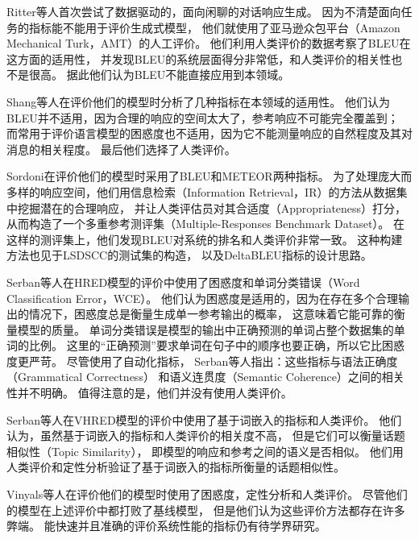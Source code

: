 Ritter等人首次尝试了数据驱动的，面向闲聊的对话响应生成。
因为不清楚面向任务的指标能不能用于评价生成式模型，
他们就使用了亚马逊众包平台（Amazon Mechanical Turk，AMT）的人工评价。
他们利用人类评价的数据考察了BLEU在这方面的适用性，
并发现BLEU的系统层面得分非常低，和人类评价的相关性也不是很高。
据此他们认为BLEU不能直接应用到本领域。

Shang等人在评价他们的模型时分析了几种指标在本领域的适用性。
他们认为BLEU并不适用，因为合理的响应的空间太大了，参考响应不可能完全覆盖到；
而常用于评价语言模型的困惑度也不适用，因为它不能测量响应的自然程度及其对消息的相关程度。
最后他们选择了人类评价。

Sordoni在评价他们的模型时采用了BLEU和METEOR两种指标。
为了处理庞大而多样的响应空间，他们用信息检索（Information Retrieval，IR）的方法从数据集中挖掘潜在的合理响应，
并让人类评估员对其合适度（Appropriateness）打分，
从而构造了一个多重参考测评集（Multiple-Responses Benchmark Dataset）。
在这样的测评集上，他们发现BLEU对系统的排名和人类评价非常一致。
这种构建方法也见于LSDSCC的测试集的构造，
以及DeltaBLEU指标的设计思路。

Serban等人在HRED模型的评价中使用了困惑度和单词分类错误（Word Classification Error，WCE）。
他们认为困惑度是适用的，因为在存在多个合理输出的情况下，困惑度总是衡量生成单一参考输出的概率，
这意味着它能可靠的衡量模型的质量。
单词分类错误是模型的输出中正确预测的单词占整个数据集的单词的比例。
这里的“正确预测”要求单词在句子中的顺序也要正确，所以它比困惑度更严苛。
尽管使用了自动化指标，
Serban等人指出：这些指标与语法正确度（Grammatical Correctness）
和语义连贯度（Semantic Coherence）之间的相关性并不明确。
值得注意的是，他们并没有使用人类评价。

Serban等人在VHRED模型的评价中使用了基于词嵌入的指标和人类评价。
他们认为，虽然基于词嵌入的指标和人类评价的相关度不高，
但是它们可以衡量话题相似性（Topic Similarity），
即模型的响应和参考之间的语义是否相似。
他们用人类评价和定性分析验证了基于词嵌入的指标所衡量的话题相似性。

Vinyals等人在评价他们的模型时使用了困惑度，定性分析和人类评价。
尽管他们的模型在上述评价中都打败了基线模型，
但是他们认为这些评价方法都存在许多弊端。
能快速并且准确的评价系统性能的指标仍有待学界研究。

